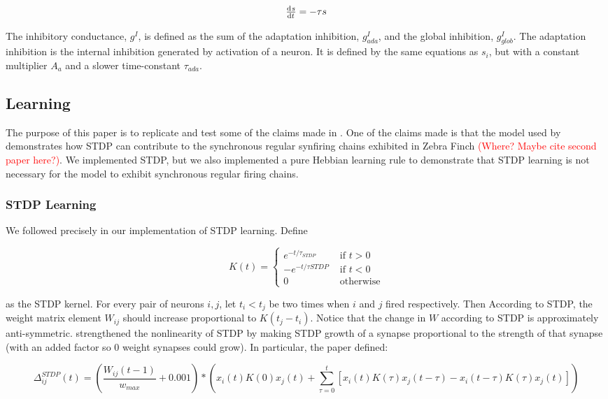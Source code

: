\[\od{s}{t} = -\tau s\]

The inhibitory conductance, \(g^I\), is defined as the sum of the adaptation inhibition, \(g^I_{ada}\), and the global inhibition, \(g^I_{glob}\). The adaptation inhibition is the internal inhibition generated by activation of a neuron. It is defined by the same equations as \(s_i\), but with a constant multiplier \(A_a\) and a slower time-constant \(\tau_{ada}\).

\subsection{Learning}

The purpose of this paper is to replicate and test some of the claims made in \cite{Fiete}. One of the claims made is that the model used by \cite{Fiete} demonstrates how STDP can contribute to the synchronous regular synfiring chains exhibited in Zebra Finch \textcolor{red}{(Where? Maybe cite second paper here?)}. We implemented STDP, but we also implemented a pure Hebbian learning rule to demonstrate that STDP learning is not necessary for the model to exhibit synchronous regular firing chains.

\subsubsection{STDP Learning}

We followed \cite{Fiete} precisely in our implementation of STDP learning. Define

\[K(t) = 
\begin{cases}
e^{-t/\tau_{STDP}} &\text{ if } t > 0\\
-e^{-t/\tau{STDP}} &\text{ if } t < 0\\
0 &\text{ otherwise}
\end{cases}
\]

as the STDP kernel. For every pair of neurons \(i,j\), let \(t_i < t_j\) be two times when \(i\) and \(j\) fired respectively. Then According to STDP, the weight matrix element \(W_{ij}\) should increase proportional to \(K(t_j - t_i)\). Notice that the change in \(W\) according to STDP is approximately anti-symmetric. \cite{Fiete} strengthened the nonlinearity of STDP by making STDP growth of a synapse proportional to the strength of that synapse (with an added factor so 0 weight synapses could grow). In particular, the paper defined:

\begin{equation}
\Delta^{STDP}_{ij}(t) = \left(\frac{W_{ij}(t-1)}{w_{max}} + 0.001\right)*\left(x_i(t)K(0)x_j(t) + \sum_{\tau = 0}^t  [x_i(t)K(\tau)x_j(t -\tau) - x_i(t - \tau)K(\tau)x_j(t)]\right)
\label{STDP}
\end{equation}

